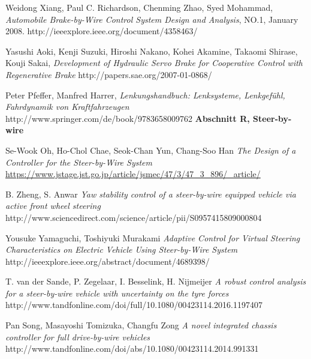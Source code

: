 \documentclass[conference]{IEEEtran}
\begin{document}
\begin{thebibliography}{1}
Weidong Xiang, Paul C. Richardson, Chenming Zhao, Syed Mohammad, 
\emph{Automobile Brake-by-Wire Control System Design and Analysis}, 
NO.1, January 2008.
http://ieeexplore.ieee.org/document/4358463/

Yasushi Aoki, Kenji Suzuki, Hiroshi Nakano, Kohei Akamine, Takaomi Shirase, Kouji Sakai, 
\emph{Development of Hydraulic Servo Brake for Cooperative Control with Regenerative Brake}
http://papers.sae.org/2007-01-0868/

Peter Pfeffer, Manfred Harrer, \emph{Lenkungshandbuch: Lenksysteme, Lenkgefühl, Fahrdynamik von Kraftfahrzeugen} http://www.springer.com/de/book/9783658009762
\textbf{Abschnitt R, Steer-by-wire}

Se-Wook Oh, Ho-Chol Chae, Seok-Chan Yun, Chang-Soo Han
\emph{The Design of a Controller for the Steer-by-Wire System}
\url{https://www.jstage.jst.go.jp/article/jsmec/47/3/47_3_896/_article/}

B. Zheng, S. Anwar
\emph{Yaw stability control of a steer-by-wire equipped vehicle via active front wheel steering}
http://www.sciencedirect.com/science/article/pii/S0957415809000804

Yousuke Yamaguchi, Toshiyuki Murakami
\emph{Adaptive Control for Virtual Steering Characteristics on Electric Vehicle Using Steer-by-Wire System}
http://ieeexplore.ieee.org/abstract/document/4689398/

T. van der Sande, P. Zegelaar, I. Besselink, H. Nijmeijer
\emph{A robust control analysis for a steer-by-wire vehicle with uncertainty on the tyre forces}
http://www.tandfonline.com/doi/full/10.1080/00423114.2016.1197407

Pan Song, Masayoshi Tomizuka, Changfu Zong
\emph{A novel integrated chassis controller for full drive-by-wire vehicles}
http://www.tandfonline.com/doi/abs/10.1080/00423114.2014.991331



\end{thebibliography}
\end{document}
